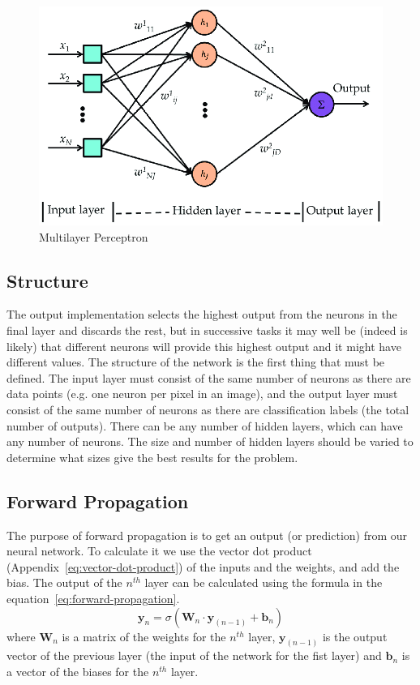 \documentclass[titlepage]{article}
\begin{document}
\begin{figure}[h!]
    \includegraphics[width=\textwidth]{assets/multilayer perceptron.png}
    \caption{Multilayer Perceptron}
    \label{fig:multilayer-perceptron}
\end{figure}
\subsection{Structure}
The output implementation selects the highest output from the neurons in the final layer and discards the rest, but in successive tasks it may well be (indeed is likely) that different neurons will provide this highest output and it might have different values. The structure of the network is the first thing that must be defined. The input layer must consist of the same number of neurons as there are data points (e.g. one neuron per pixel in an image), and the output layer must consist of the same number of neurons as there are classification labels (the total number of outputs). There can be any number of hidden layers, which can have any number of neurons. The size and number of hidden layers should be varied to determine what sizes give the best results for the problem.

\subsection{Forward Propagation}
The purpose of forward propagation is to get an output (or prediction) from our neural network. To calculate it we use the vector dot product (Appendix~\ref{eq:vector-dot-product}) of the inputs and the weights, and add the bias. The output of the $n^{th}$ layer can be calculated using the formula in the equation~\ref{eq:forward-propagation}.
\begin{equation}
    \textbf{y}_n = \sigma{(\textbf{W}_n\cdot\textbf{y}_{(n-1)} + \textbf{b}_n)}
    \label{eq:forward-propagation}
\end{equation}
where $\textbf{W}_n$ is a matrix of the weights for the $n^{th}$ layer, $\textbf{y}_{(n-1)}$ is the output vector of the previous layer (the input of the network for the fist layer) and $\textbf{b}_n$ is a vector of the biases for the $n^{th}$ layer.
\end{document}
